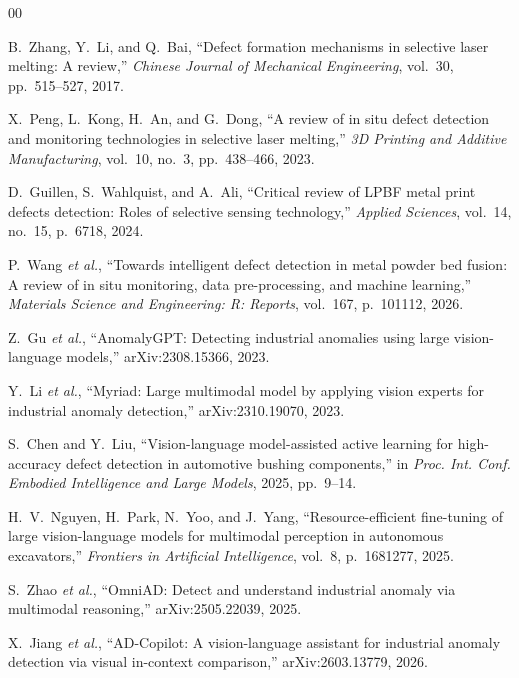 \documentclass[journal]{IEEEtran}
\begin{document}
\begin{thebibliography}{00}

B.~Zhang, Y.~Li, and Q.~Bai, ``Defect formation mechanisms in selective laser melting: A review,'' \emph{Chinese Journal of Mechanical Engineering}, vol.~30, pp.~515--527, 2017.

X.~Peng, L.~Kong, H.~An, and G.~Dong, ``A review of in situ defect detection and monitoring technologies in selective laser melting,'' \emph{3D Printing and Additive Manufacturing}, vol.~10, no.~3, pp.~438--466, 2023.

D.~Guillen, S.~Wahlquist, and A.~Ali, ``Critical review of LPBF metal print defects detection: Roles of selective sensing technology,'' \emph{Applied Sciences}, vol.~14, no.~15, p.~6718, 2024.

P.~Wang \emph{et al.}, ``Towards intelligent defect detection in metal powder bed fusion: A review of in situ monitoring, data pre-processing, and machine learning,'' \emph{Materials Science and Engineering: R: Reports}, vol.~167, p.~101112, 2026.

Z.~Gu \emph{et al.}, ``AnomalyGPT: Detecting industrial anomalies using large vision-language models,'' arXiv:2308.15366, 2023.

Y.~Li \emph{et al.}, ``Myriad: Large multimodal model by applying vision experts for industrial anomaly detection,'' arXiv:2310.19070, 2023.

S.~Chen and Y.~Liu, ``Vision-language model-assisted active learning for high-accuracy defect detection in automotive bushing components,'' in \emph{Proc. Int. Conf. Embodied Intelligence and Large Models}, 2025, pp.~9--14.

H.~V.~Nguyen, H.~Park, N.~Yoo, and J.~Yang, ``Resource-efficient fine-tuning of large vision-language models for multimodal perception in autonomous excavators,'' \emph{Frontiers in Artificial Intelligence}, vol.~8, p.~1681277, 2025.

S.~Zhao \emph{et al.}, ``OmniAD: Detect and understand industrial anomaly via multimodal reasoning,'' arXiv:2505.22039, 2025.

X.~Jiang \emph{et al.}, ``AD-Copilot: A vision-language assistant for industrial anomaly detection via visual in-context comparison,'' arXiv:2603.13779, 2026.


\end{thebibliography}
\end{document}
